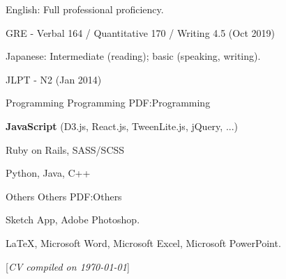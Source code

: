 \documentclass[letterpaper,MMMyyyy,nonstopmode]{template}
\newcommand{\CVNote}{CV compiled on {\today}}
\begin{document}
\begin{Body}
\Gap
\BulletItem
English: Full professional proficiency.
\begin{Detail}
\SubBulletItem
GRE - Verbal 164 / Quantitative 170 / Writing 4.5 (Oct 2019)
\end{Detail}

\Gap
\BulletItem
Japanese: Intermediate (reading); basic (speaking, writing).
\begin{Detail}
\SubBulletItem
JLPT - N2 (Jan 2014)
\end{Detail}

\BigGap
\SubSection
{Programming}
{Programming}
{PDF:Programming}

\BigGap
\BulletItem
\textbf{JavaScript} (D3.js, React.js, TweenLite.js, jQuery, ...)

\Gap
\BulletItem
Ruby on Rails,
SASS/SCSS

\Gap
\BulletItem
Python, Java, C++

\BigGap
\SubSection
{Others}
{Others}
{PDF:Others}

\BigGap
\BulletItem
Sketch App,
Adobe Photoshop.

\Gap
\BulletItem
{\LaTeX},
Microsoft Word,
Microsoft Excel,
Microsoft PowerPoint.

\end{Body}


\BigGap
\UseNoteFont%
\null\hfill%
[\textit{\CVNote}]
\end{document}
